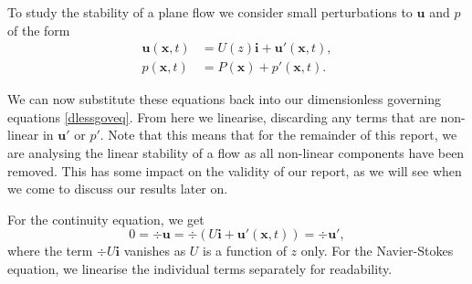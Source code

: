 To study the stability of a plane flow we consider small perturbations to $ \mathbf{u} $ and $ p $ of the form
\begin{align}
    \mathbf{u}(\mathbf{x}, t) &= U(z) \mathbf{i} + \mathbf{u}'(\mathbf{x}, t), \nonumber\\
    p(\mathbf{x}, t) &= P(\mathbf{x}) + p'(\mathbf{x}, t).
\end{align}

We can now substitute these equations back into our dimensionless governing equations \eqref{dlessgoveq}. From here we linearise, discarding any terms that are non-linear in  $ \mathbf{u}' $ or  $ p' $. Note that this means that for the remainder of this report, we are analysing the linear stability of a flow as all non-linear components have been removed. This has some impact on the validity of our report, as we will see when we come to discuss our results later on.

For the continuity equation, we get
\begin{equation}
    0 = \div{\mathbf{u}} =  \div{( U \mathbf{i} + \mathbf{u}'(\mathbf{x}, t))} = \div{\mathbf{u}'},
\label{contlin}
\end{equation} 
where the term $ \div{U \mathbf{i}} $ vanishes as $ U $ is a function of $ z $ only.
For the Navier-Stokes equation, we linearise the individual terms separately for readability. 

